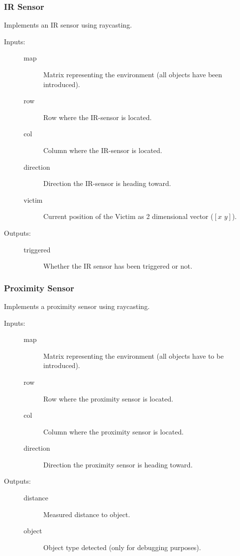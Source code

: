 \documentclass[a4paper,parskip,headheight=38pt]{scrartcl} %
\begin{document}
\subsubsection{IR Sensor}
Implements an IR sensor using raycasting.
\begin{description}
\item[Inputs:] \hfill
	\begin{description}
	\item[map] Matrix representing the environment (all objects have been introduced).
	\item[row] Row where the IR-sensor is located.
	\item[col] Column where the IR-sensor is located.
	\item[direction] Direction the IR-sensor is heading toward.
	\item[victim] Current position of the Victim as 2 dimensional vector ($[x\,\, y]$). 
	\end{description}
\item[Outputs:] \hfill
	\begin{description}
	\item[triggered] Whether the IR sensor has been triggered or not.
	\end{description}
\end{description}

\subsubsection{Proximity Sensor}
Implements a proximity sensor using raycasting.
\begin{description}
\item[Inputs:] \hfill
	\begin{description}
	\item[map] Matrix representing the environment (all objects have to be introduced).
	\item[row] Row where the proximity sensor is located.
	\item[col] Column where the proximity sensor is located.
	\item[direction] Direction the proximity sensor is heading toward.
	\end{description}
\item[Outputs:] \hfill
	\begin{description}
	\item[distance] Measured distance to object.
	\item[object] Object type detected (only for debugging purposes).
	\end{description}
\end{description}
\end{document}
